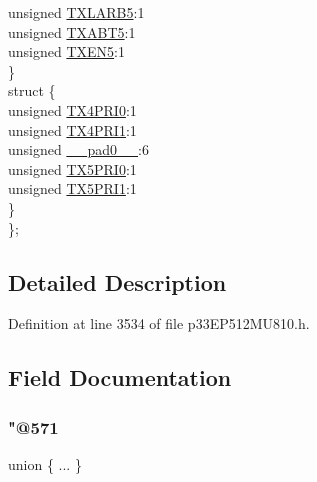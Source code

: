 \begin{DoxyCompactItemize}
\begin{tabbing}
\>\>unsigned \hyperlink{structtag_c1_t_r45_c_o_n_b_i_t_s_a8c1c239200afa1f955c5c4bc6b605c31}{TXLARB5}:1\\
\>\>unsigned \hyperlink{structtag_c1_t_r45_c_o_n_b_i_t_s_a6ae03d5a9518c606215c03edf9add7b8}{TXABT5}:1\\
\>\>unsigned \hyperlink{structtag_c1_t_r45_c_o_n_b_i_t_s_ae76ce39447cf8b46fd18c54522ed7864}{TXEN5}:1\\
\>\} \\
\>struct \{\\
\>\>unsigned \hyperlink{structtag_c1_t_r45_c_o_n_b_i_t_s_a2ca298d34b532e067bfe454f9bb980c5}{TX4PRI0}:1\\
\>\>unsigned \hyperlink{structtag_c1_t_r45_c_o_n_b_i_t_s_ae2c490c19ec502d0fa63d677df0a8397}{TX4PRI1}:1\\
\>\>unsigned \hyperlink{structtag_c1_t_r45_c_o_n_b_i_t_s_adf71f3d8410c1f1dbbc96680a92c49af}{\_\_pad0\_\_}:6\\
\>\>unsigned \hyperlink{structtag_c1_t_r45_c_o_n_b_i_t_s_abd45feebb18858a80521772247bec761}{TX5PRI0}:1\\
\>\>unsigned \hyperlink{structtag_c1_t_r45_c_o_n_b_i_t_s_a147ce4c79f3c3229e00f431795d9cfe1}{TX5PRI1}:1\\
\>\} \\
\}; \\

\end{tabbing}\end{DoxyCompactItemize}


\subsection{Detailed Description}


Definition at line 3534 of file p33\+E\+P512\+M\+U810.\+h.



\subsection{Field Documentation}
\mbox{\label{structtag_c1_t_r45_c_o_n_b_i_t_s_a82607bcda5950e769bd6c04038f5ae5b}} 
\subsubsection{\texorpdfstring{"@571}{@571}}
{\footnotesize\ttfamily union \{ ... \} }

\mbox{\label{structtag_c1_t_r45_c_o_n_b_i_t_s_adf71f3d8410c1f1dbbc96680a92c49af}} 
